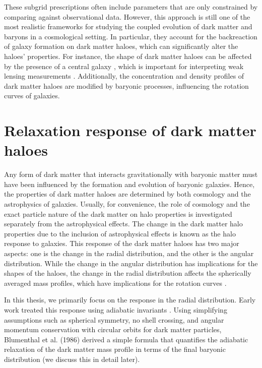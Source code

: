 These subgrid prescriptions often include parameters that are only constrained by comparing against observational data. However, this approach is still one of the most realistic frameworks for studying the coupled evolution of dark matter and baryons in a cosmological setting. In particular, they account for the backreaction of galaxy formation on dark matter haloes, which can significantly alter the haloes' properties. For instance, the shape of dark matter haloes can be affected by the presence of a central galaxy \citep{2010MNRAS.407..435A,2021MNRAS.501.5679C}, which is important for interpreting weak lensing measurements \citep{2021A&A...647A.185G}. Additionally, the concentration and density profiles of dark matter haloes are modified by baryonic processes, influencing the rotation curves of galaxies.


\section{Relaxation response of dark matter haloes}

Any form of dark matter that interacts gravitationally with baryonic matter must have been influenced by the formation and evolution of baryonic galaxies. Hence, the properties of dark matter haloes are determined by both cosmology and the astrophysics of galaxies. Usually, for convenience, the role of cosmology and the exact particle nature of the dark matter on halo properties is investigated separately from the astrophysical effects. The change in the dark matter halo properties due to the inclusion of astrophysical effects is known as the halo response to galaxies. This response of the dark matter haloes has two major aspects: one is the change in the radial distribution, and the other is the angular distribution. While the change in the angular distribution has implications for the shapes of the haloes, the change in the radial distribution affects the spherically averaged mass profiles, which have implications for the rotation curves \citep[][]{2004ApJ...616...16G,2006PhRvD..74l3522G,2010MNRAS.402..776P,2010MNRAS.406..922T,2010MNRAS.405.2161D,2010MNRAS.407..435A,2011MNRAS.414..195T,2016MNRAS.461.2658D,2019A&A...622A.197A,2022MNRAS.511.3910F,2023Velmani&Paranjape}.

In this thesis, we primarily focus on the response in the radial distribution. Early work treated this response using adiabatic invariants \citep[][]{osti6457593,1984MNRAS.211..753B,1986ApJ...301...27B,1987ApJ...318...15R}. Using simplifying assumptions such as spherical symmetry, no shell crossing, and angular momentum conservation with circular orbits for dark matter particles, Blumenthal et al. (1986) \citep[][]{1986ApJ...301...27B} derived a simple formula that quantifies the adiabatic relaxation of the dark matter mass profile in terms of the final baryonic distribution (we discuss this in detail later).

